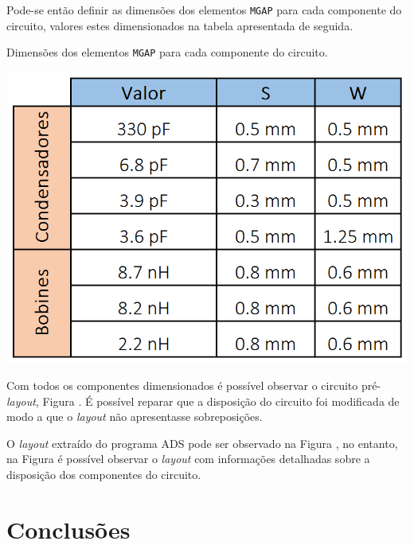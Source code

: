 \documentclass[11pt]{article}
\numberwithin{equation}{section}
\begin{document}
\vspace{1mm}
Pode-se então definir as dimensões dos elementos \texttt{MGAP} para cada componente do circuito, valores estes dimensionados na tabela apresentada de seguida. 

\begin{table}[H]
	\centering
	\caption{Dimensões dos elementos \texttt{MGAP} para cada componente do circuito.}
	\vspace{-1.5mm}
	\includegraphics[keepaspectratio=true, scale=0.40]{teoricas/aSS}
\end{table}

Com todos os componentes dimensionados é possível observar o circuito pré-\textit{layout}, Figura . É possível reparar que a disposição do circuito foi modificada de modo a que o \textit{layout} não apresentasse sobreposições.

O \textit{layout} extraído do programa ADS pode ser observado na Figura , no entanto, na Figura  é possível observar o \textit{layout} com informações detalhadas sobre a disposição dos componentes do circuito.

\section{Conclusões}
\end{document}

